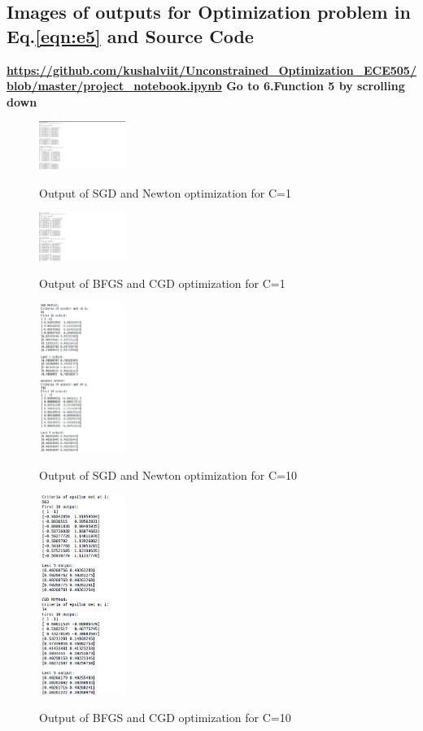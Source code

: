 \documentclass[paper=a4, fontsize=11pt]{scrartcl}
\numberwithin{equation}{section}		%
\numberwithin{figure}{section}			%
\numberwithin{table}{section}				%
\begin{document}
\subsection*{Images of outputs for Optimization problem in Eq.\ref{eqn:e5} and Source Code}
\textbf{\url{https://github.com/kushalviit/Unconstrained_Optimization_ECE505/blob/master/project_notebook.ipynb}
Go to 6.Function 5 by scrolling down}
\begin{figure}[H]
\caption{Output of SGD and Newton optimization for C=1}
\centering
\includegraphics[width=0.25\textwidth]{out11.png}
\label{out11}
\end{figure}
\begin{figure}[H]
\caption{Output of BFGS and CGD optimization for C=1}
\centering
\includegraphics[width=0.25\textwidth]{out12.png}
\label{out12}
\end{figure}
\begin{figure}[H]
\caption{Output of SGD and Newton optimization for C=10}
\centering
\includegraphics[width=0.25\textwidth]{out13.png}
\label{out13}
\end{figure}
\begin{figure}[H]
\caption{Output of BFGS and CGD optimization for C=10}
\centering
\includegraphics[width=0.25\textwidth]{out14.png}
\label{out14}
\end{figure}
\end{document}
